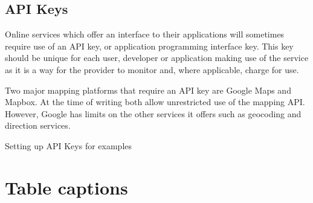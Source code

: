 \documentclass[utf8]{frontiersHLTH}
\begin{document}
\subsection{API Keys}\label{api-keys}

Online services which offer an interface to their applications will
sometimes require use of an API key, or application programming
interface key. This key should be unique for each user, developer or
application making use of the service as it is a way for the provider to
monitor and, where applicable, charge for use.

Two major mapping platforms that require an API key are Google Maps and
Mapbox. At the time of writing both allow unrestricted use of the
mapping API. However, Google has limits on the other services it offers
such as geocoding and direction services.

Setting up API Keys for examples

\section*{Table captions}
\end{document}
